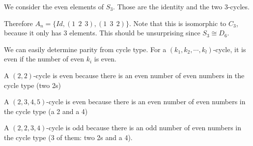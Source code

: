 \documentclass[../Main.tex]{subfiles}
\begin{document}
\begin{example}[Elements of $A_3$]
    We consider the even elements of $S_3$. Those are the identity and the two 3-cycles.\par
    Therefore $A_n = \{Id, (1~~2~~3), (1~~3~~2)\}$. Note that this is isomorphic to $C_3$, because it only has 3 elements. This should be unsurprising since $S_3 \cong D_6$.
\end{example}
We can easily determine parity from cycle type. For a $(k_1, k_2, \cdots, k_l)$-cycle, it is even if the number of even $k_i$ is even.
\begin{examples}{}
    \item A $(2, 2)$-cycle is even because there is an even number of even numbers in the cycle type (two 2s)
    \item A $(2, 3, 4, 5)$-cycle is even because there is an even number of even numbers in the cycle type (a 2 and a 4)
    \item A $(2, 2, 3, 4)$-cycle is odd because there is an odd number of even numbers in the cycle type (3 of them: two 2s and a 4).
\end{examples}
\end{document}
